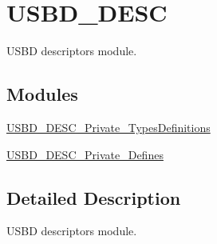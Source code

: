 \hypertarget{group__USBD__DESC}{\section{U\-S\-B\-D\-\_\-\-D\-E\-S\-C}
\label{group__USBD__DESC}
}


U\-S\-B\-D descriptors module.  


\subsection*{Modules}
\begin{DoxyCompactItemize}
\item 
\hyperlink{group__USBD__DESC__Private__TypesDefinitions}{U\-S\-B\-D\-\_\-\-D\-E\-S\-C\-\_\-\-Private\-\_\-\-Types\-Definitions}
\item 
\hyperlink{group__USBD__DESC__Private__Defines}{U\-S\-B\-D\-\_\-\-D\-E\-S\-C\-\_\-\-Private\-\_\-\-Defines}
\end{DoxyCompactItemize}


\subsection{Detailed Description}
U\-S\-B\-D descriptors module. 